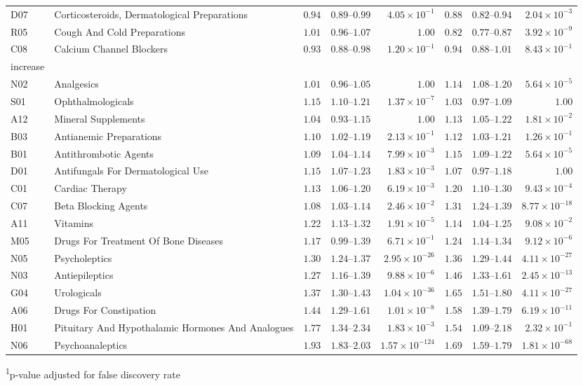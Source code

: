 \begin{longtable}{llrrrrrr}
D07 & Corticosteroids, Dermatological Preparations & $0.94$ & $0.89$–$0.99$ & $4.05 \times 10^{-1}$ & $0.88$ & $0.82$–$0.94$ & $2.04 \times 10^{-3}$ \\ 
R05 & Cough And Cold Preparations & $1.01$ & $0.96$–$1.07$ & $1.00$ & $0.82$ & $0.77$–$0.87$ & $3.92 \times 10^{-9}$ \\ 
C08 & Calcium Channel Blockers & $0.93$ & $0.88$–$0.98$ & $1.20 \times 10^{-1}$ & $0.94$ & $0.88$–$1.01$ & $8.43 \times 10^{-1}$ \\ 
\midrule
\multicolumn{1}{l}{increase} \\ 
\midrule
N02 & Analgesics & $1.01$ & $0.96$–$1.05$ & $1.00$ & $1.14$ & $1.08$–$1.20$ & $5.64 \times 10^{-5}$ \\ 
S01 & Ophthalmologicals & $1.15$ & $1.10$–$1.21$ & $1.37 \times 10^{-7}$ & $1.03$ & $0.97$–$1.09$ & $1.00$ \\ 
A12 & Mineral Supplements & $1.04$ & $0.93$–$1.15$ & $1.00$ & $1.13$ & $1.05$–$1.22$ & $1.81 \times 10^{-2}$ \\ 
B03 & Antianemic Preparations & $1.10$ & $1.02$–$1.19$ & $2.13 \times 10^{-1}$ & $1.12$ & $1.03$–$1.21$ & $1.26 \times 10^{-1}$ \\ 
B01 & Antithrombotic Agents & $1.09$ & $1.04$–$1.14$ & $7.99 \times 10^{-3}$ & $1.15$ & $1.09$–$1.22$ & $5.64 \times 10^{-5}$ \\ 
D01 & Antifungals For Dermatological Use & $1.15$ & $1.07$–$1.23$ & $1.83 \times 10^{-3}$ & $1.07$ & $0.97$–$1.18$ & $1.00$ \\ 
C01 & Cardiac Therapy & $1.13$ & $1.06$–$1.20$ & $6.19 \times 10^{-3}$ & $1.20$ & $1.10$–$1.30$ & $9.43 \times 10^{-4}$ \\ 
C07 & Beta Blocking Agents & $1.08$ & $1.03$–$1.14$ & $2.46 \times 10^{-2}$ & $1.31$ & $1.24$–$1.39$ & $8.77 \times 10^{-18}$ \\ 
A11 & Vitamins & $1.22$ & $1.13$–$1.32$ & $1.91 \times 10^{-5}$ & $1.14$ & $1.04$–$1.25$ & $9.08 \times 10^{-2}$ \\ 
M05 & Drugs For Treatment Of Bone Diseases & $1.17$ & $0.99$–$1.39$ & $6.71 \times 10^{-1}$ & $1.24$ & $1.14$–$1.34$ & $9.12 \times 10^{-6}$ \\ 
N05 & Psycholeptics & $1.30$ & $1.24$–$1.37$ & $2.95 \times 10^{-26}$ & $1.36$ & $1.29$–$1.44$ & $4.11 \times 10^{-27}$ \\ 
N03 & Antiepileptics & $1.27$ & $1.16$–$1.39$ & $9.88 \times 10^{-6}$ & $1.46$ & $1.33$–$1.61$ & $2.45 \times 10^{-13}$ \\ 
G04 & Urologicals & $1.37$ & $1.30$–$1.43$ & $1.04 \times 10^{-36}$ & $1.65$ & $1.51$–$1.80$ & $4.11 \times 10^{-27}$ \\ 
A06 & Drugs For Constipation & $1.44$ & $1.29$–$1.61$ & $1.01 \times 10^{-8}$ & $1.58$ & $1.39$–$1.79$ & $6.19 \times 10^{-11}$ \\ 
H01 & Pituitary And Hypothalamic Hormones And Analogues & $1.77$ & $1.34$–$2.34$ & $1.83 \times 10^{-3}$ & $1.54$ & $1.09$–$2.18$ & $2.32 \times 10^{-1}$ \\ 
N06 & Psychoanaleptics & $1.93$ & $1.83$–$2.03$ & $1.57 \times 10^{-124}$ & $1.69$ & $1.59$–$1.79$ & $1.81 \times 10^{-68}$ \\ 
\bottomrule
\end{longtable}
\begin{minipage}{\linewidth}
\textsuperscript{1}p-value adjusted for false discovery rate\\
\end{minipage}


